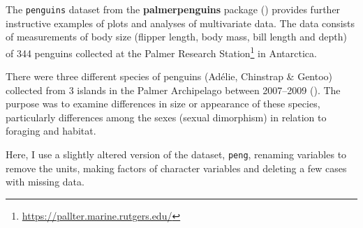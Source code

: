 \documentclass[
  letterpaper,
  10pt,
  krantz2]{krantz}
\providecommand{\href}[2]{#2\footnote{\url{#1}}}
\begin{document}
The \texttt{penguins} dataset from the \textbf{palmerpenguins} package
() provides further
instructive examples of plots and analyses of multivariate data. The
data consists of measurements of body size (flipper length, body mass,
bill length and depth) of 344 penguins collected at the
\href{https://pallter.marine.rutgers.edu/}{Palmer Research Station} in
Antarctica.

There were three different species of penguins (Adélie, Chinstrap \&
Gentoo) collected from 3 islands in the Palmer Archipelago between
2007--2009 (). The purpose
was to examine differences in size or appearance of these species,
particularly differences among the sexes (sexual dimorphism) in relation
to foraging and habitat.

Here, I use a slightly altered version of the dataset, \texttt{peng},
renaming variables to remove the units, making factors of character
variables and deleting a few cases with missing data.
\end{document}
